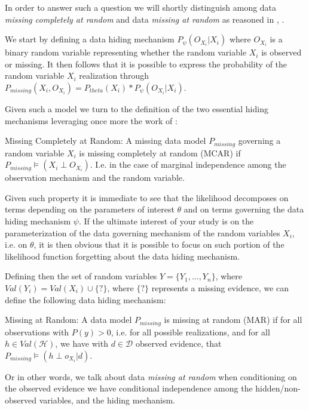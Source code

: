 \documentclass[11pt]{article}
\begin{document}
\begin{article}
In order to answer such a question we will shortly distinguish among
data \emph{missing completely at random} and data \emph{missing at random} as
reasoned in \cite{little1976inference}, \cite{rubin1976inference}.

We start by defining a data hiding mechanism \(P_\psi(O_{X_i}|X_i)\) where
\(O_{X_i}\) is a binary random variable representing whether the
random variable \(X_i\) is observed or missing. It then follows that
it is possible to express the probability of the random variable
\(X_i\) realization through \(P_{missing}(X_i, O_{X_i}) = P_{theta}(X_i) *
  P_\psi(O_{X_i}|X_i)\).

Given such a model we turn to the definition of the two essential
hiding mechanisms leveraging once more the work of \cite{koller2009probabilistic}:

\begin{definition}
Missing Completely at Random: A missing data model $P_{missing}$ governing a
random variable $X_i$ is missing
completely at random (MCAR) if $P_{missing} \models (X_i \perp O_{X_i})$.
I.e. in the case of marginal independence among the observation mechanism
and the random variable.
\end{definition}  

Given such property it is immediate to see that the likelihood
decomposes on terms depending on the parameters of interest \(\theta\)
and on terms governing the data hiding mechanism \(\psi\). If the
ultimate interest of your study is on the parameterization of the
data governing mechanism of the random variables \(X_i\), i.e. on
\(\theta\), it is then obvious that it is possible to focus on such
portion of the likelihood function forgetting about the data hiding
mechanism.

Defining then the set of random variables \(Y = \{Y_1, . . . , Y_n\}\),
where \(Val(Y_i) = Val(X_i) \cup \{?\}\), where \(\{?\}\) represents a
missing evidence, we can define the following data hiding mechanism:

\begin{definition}
Missing at Random: A data model $P_{missing}$ is missing at random (MAR)
if for all observations with $P(y) > 0$, i.e. for all possible realizations,
and for all $h \in Val(\mathscr{H})$, we have with $d \in \mathscr{D}$
observed evidence, that $ P_{missing} \models (h \perp o_{X_i} | d) $.
\end{definition}  

Or in other words, we talk about data \emph{missing at random} when
conditioning on the observed evidence we have conditional
independence among the hidden/non-observed variables, and the
hiding mechanism.


\end{article}
\end{document}
